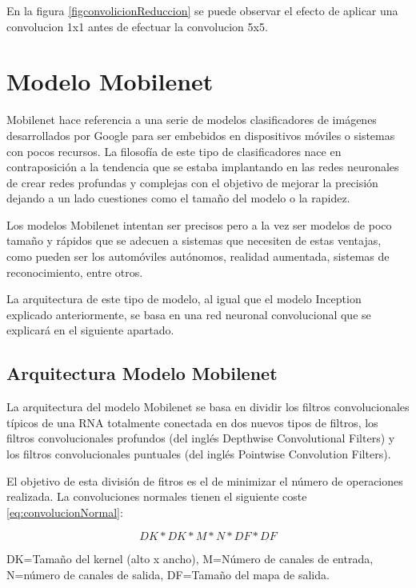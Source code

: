 En la figura \ref{figconvolicionReduccion} se puede observar el efecto de aplicar una convolucion 1x1 antes de efectuar la convolucion 5x5.

\section{Modelo Mobilenet}

Mobilenet hace referencia a una serie de modelos clasificadores de imágenes desarrollados por Google para ser embebidos en dispositivos móviles o sistemas con pocos recursos. La filosofía de este tipo de clasificadores nace en contraposición a la tendencia que se estaba implantando en las redes neuronales de crear redes profundas y complejas con el objetivo de mejorar la precisión dejando a un lado cuestiones como el tamaño del modelo o la rapidez.\cite{mobilenet}

Los modelos Mobilenet intentan ser precisos pero a la vez ser modelos de poco tamaño y rápidos que se adecuen a sistemas que necesiten de estas ventajas, como pueden ser los automóviles autónomos, realidad aumentada, sistemas de reconocimiento, entre otros.

La arquitectura de este tipo de modelo, al igual que el modelo Inception explicado anteriormente, se basa en una red neuronal convolucional que se explicará en el siguiente apartado.

\subsection{Arquitectura Modelo Mobilenet}

La arquitectura del modelo Mobilenet se basa en dividir los filtros convolucionales típicos de una RNA totalmente conectada en dos nuevos tipos de filtros, los filtros convolucionales profundos (del inglés Depthwise Convolutional Filters) y los filtros convolucionales puntuales (del inglés Pointwise Convolution Filters).

El objetivo de esta división de fitros es el de minimizar el número de operaciones realizada. La convoluciones normales tienen el siguiente coste \ref{eq:convolucionNormal}:

\begin{equation} \label{eq:convolucionNormal}
	DK * DK * M * N * DF * DF
\end{equation}

DK=Tamaño del kernel (alto x ancho), M=Número de canales de entrada, N=número de canales de salida, DF=Tamaño del mapa de salida.


